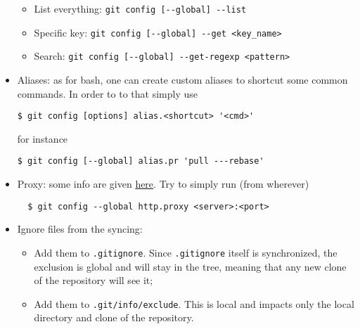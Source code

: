 \documentclass[a4paper,12pt,%
              final%
              ]{article}
\begin{document}
\begin{itemize}
\begin{itemize}
      \item List everything: \verb|git config [--global] --list|
      \item Specific key: \verb|git config [--global] --get <key_name>|
      \item Search: \verb|git config [--global] --get-regexp <pattern>|
    \end{itemize}
  \item Aliases: as for bash, one can create custom aliases to shortcut some common commands. In order to to that simply use
\begin{verbatim}
$ git config [options] alias.<shortcut> '<cmd>'
\end{verbatim}
        for instance
\begin{verbatim}
$ git config [--global] alias.pr 'pull ---rebase'
\end{verbatim}
  \item Proxy: some info are given \href{https://gist.github.com/evantoli/f8c23a37eb3558ab8765}{here}. Try to simply run (from wherever)
\begin{verbatim}
  $ git config --global http.proxy <server>:<port>
\end{verbatim}
  \item Ignore files from the syncing:
    \begin{itemize}
      \item Add them to \texttt{.gitignore}. Since \texttt{.gitignore} itself is synchronized, the exclusion is global and will stay in the tree, meaning that any new clone of the repository will see it;
      \item Add them to \texttt{.git/info/exclude}. This is local and impacts only the local directory and clone of the repository.
    \end{itemize}

\end{itemize}
\end{document}
